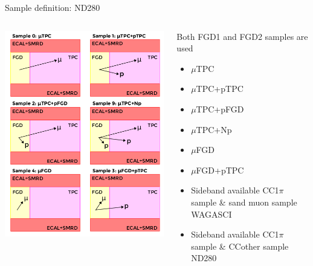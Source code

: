 \documentclass{beamer}
\begin{document}
\begin{frame}{Sample definition: ND280}

\begin{columns}[c]
\begin{column}{.5\textwidth}
\includegraphics[width=\textwidth]{images/ND280_sig.png}
\end{column}
\begin{column}{.5\textwidth}
Both FGD1 and FGD2 samples are used 
\begin{itemize}
    \item $\mu$TPC 
    \item $\mu$TPC+pTPC
    \item $\mu$TPC+pFGD
    \item $\mu$TPC+Np
    \item $\mu$FGD 
    \item $\mu$FGD+pTPC 
\end{itemize}
\vfill
\begin{block}{}
\begin{itemize}
    \item Sideband available CC1$\pi$ sample \& sand muon sample WAGASCI
    \item Sideband available CC1$\pi$ sample \& CCother sample ND280
\end{itemize}
\end{block}
\end{column}
\end{columns}
\end{frame}
\end{document}
